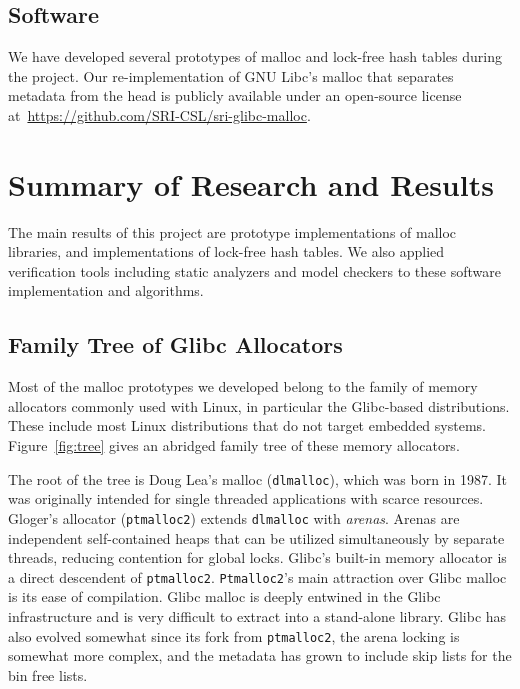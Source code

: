 \documentclass[twoside,12pt]{cslreport}
\begin{document}
\section{Software}

We have developed several prototypes of malloc and lock-free hash
tables during the project. Our re-implementation of GNU Libc's malloc
that separates metadata from the head is publicly available under an
open-source license at~\url{https://github.com/SRI-CSL/sri-glibc-malloc}.




\chapter{Summary of Research and Results}

The main results of this project are prototype implementations of
malloc libraries, and implementations of lock-free hash tables. We
also applied verification tools including static analyzers and model
checkers to these software implementation and algorithms.

\section{Family Tree of Glibc Allocators}
\label{family-tree}

Most of the malloc prototypes we developed belong to the family of
memory allocators commonly used with Linux, in particular the
Glibc-based distributions.  These include most Linux distributions
that do not target embedded systems. Figure~\ref{fig:tree} gives an
abridged family tree of these memory allocators.

The root of the tree is Doug Lea's malloc (\texttt{dlmalloc}), which
was born in 1987.  It was originally intended for single threaded
applications with scarce resources.
%
Gloger's allocator (\texttt{ptmalloc2}) extends \texttt{dlmalloc} with
\emph{arenas}.  Arenas are independent self-contained heaps that can
be utilized simultaneously by separate threads, reducing contention
for global locks.
%
Glibc's built-in memory allocator is a direct descendent of
\texttt{ptmalloc2}. \texttt{Ptmalloc2}'s main attraction over Glibc
malloc is its ease of compilation. Glibc malloc is deeply entwined in
the Glibc infrastructure and is very difficult to extract into a
stand-alone library.  Glibc has also evolved somewhat since its fork
from \texttt{ptmalloc2}, the arena locking is somewhat more complex,
and the metadata has grown to include skip lists for the bin free
lists.
\end{document}
